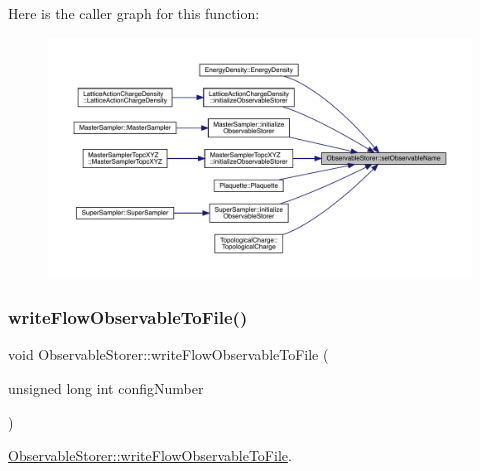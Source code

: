 Here is the caller graph for this function\+:\nopagebreak
\begin{figure}[H]
\begin{center}
\leavevmode
\includegraphics[width=350pt]{class_observable_storer_a7f4847c4fdbf8764d8f07950c4d4b62a_icgraph}
\end{center}
\end{figure}
\mbox{\label{class_observable_storer_af51ebd65eae2a5087cfd47ddf230da93}} 
\subsubsection{\texorpdfstring{writeFlowObservableToFile()}{writeFlowObservableToFile()}}
{\footnotesize\ttfamily void Observable\+Storer\+::write\+Flow\+Observable\+To\+File (\begin{DoxyParamCaption}\item[{unsigned long int}]{config\+Number }\end{DoxyParamCaption})}



\mbox{\hyperlink{class_observable_storer_af51ebd65eae2a5087cfd47ddf230da93}{Observable\+Storer\+::write\+Flow\+Observable\+To\+File}}. 


